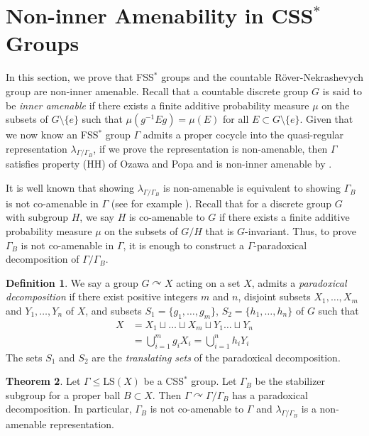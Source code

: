 \documentclass[12pt]{amsart}
\numberwithin{equation}{subsection}
\theoremstyle{definition}
\newtheorem{theorem}{Theorem}[section]
\theoremstyle{definition}
\newtheorem{definition}[theorem]{Definition}
\theoremstyle{remark}
\begin{document}
\section{Non-inner Amenability in \texorpdfstring{CSS$^*$}{CSS*} Groups}\label{sec:nonInnerAmeanCSS}

In this section, we prove that FSS$^*$ groups and the countable R\"{o}ver-Nekrashevych group are non-inner amenable. Recall that a countable discrete group $G$ is said to be \emph{inner amenable} if there exists a finite additive probability measure $\mu$ on the subsets of $G \setminus \{e\}$ such that $\mu(g^{-1}Eg) =\mu(E)$ for all $E \subset G \setminus\{e\}$. Given that we now know an FSS$^*$ group $\Gamma$ admits a proper cocycle into the quasi-regular representation $\lambda_{\Gamma /\Gamma_B}$, if we prove the representation is non-amenable, then $\Gamma$ satisfies property (HH) of Ozawa and Popa and is non-inner amenable by \cite[Proposition 2.1]{ozawapopa2010cartanII}. 


It is well known that showing $\lambda_{\Gamma /\Gamma_B}$ is non-amenable is equivalent to showing $\Gamma_B$ is not co-amenable in $\Gamma$ (see for example \cite[Theorem 2.3]{bekka1990}). Recall that for a discrete group $G$ with subgroup $H$, we say $H$ is co-amenable to $G$ if there exists a finite additive probability measure $\mu$ on the subsets of $G/H$ that is $G$-invariant. Thus, to prove $\Gamma_B$ is not co-amenable in $\Gamma$, it is enough to construct a $\Gamma$-paradoxical decomposition of $\Gamma / \Gamma_B$. 


\begin{definition}
We say a group $G \curvearrowright X$ acting on a set $X$, admits a \emph{paradoxical decomposition} if there exist positive integers $m$ and $n$, disjoint subsets $X_1, \dots , X_m$ and $Y_1, \dots, Y_n$ of $X$, and subsets $S_1 = \{g_1, \dots, g_m \}$, $S_2 = \{h_1, \dots, h_n \}$ of $G$ such that
\begin{align*}
    X &= X_1 \sqcup\dots \sqcup X_m \sqcup Y_1 \dots \sqcup Y_n \\
    & = \bigcup_{i=1}^m g_iX_i = \bigcup_{i=1}^n h_iY_i
\end{align*}
The sets $S_1$ and $S_2$ are the \emph{translating sets} of the paradoxical decomposition.
\end{definition}

\begin{theorem}\label{thm:paradoxical}
    Let $\Gamma \leq \text{LS}(X)$ be a CSS$^*$ group. Let $\Gamma_{B}$ be the stabilizer subgroup for a proper ball $B \subset X$. Then $\Gamma \curvearrowright \Gamma / \Gamma_{B}$ has a paradoxical decomposition. In particular, $\Gamma_{B}$ is not co-amenable to $\Gamma$ and $\lambda_{\Gamma /\Gamma_{B}}$ is a non-amenable representation.
\end{theorem}
\end{document}
